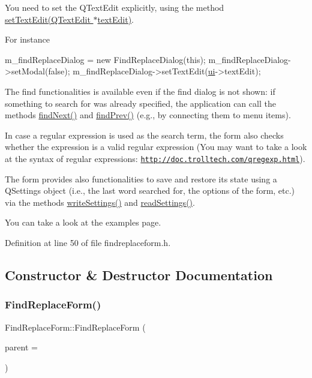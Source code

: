 You need to set the Q\+Text\+Edit explicitly, using the method \hyperlink{class_find_replace_form_ad621f91f15f0902a050c67e66c839d6f}{set\+Text\+Edit(\+Q\+Text\+Edit $\ast$text\+Edit)}.

For instance 
\begin{DoxyCode}
m\_findReplaceDialog = \textcolor{keyword}{new} FindReplaceDialog(\textcolor{keyword}{this});
m\_findReplaceDialog->setModal(\textcolor{keyword}{false});
m\_findReplaceDialog->setTextEdit(\hyperlink{class_find_replace_form_a9bf9e9096feff863dcd6c2a989e07d2c}{ui}->textEdit);
\end{DoxyCode}


The find functionalities is available even if the find dialog is not shown\+: if something to search for was already specified, the application can call the methods \hyperlink{class_find_replace_form_a4aa85cfca1753dd04c1a118ac17257d9}{find\+Next()} and \hyperlink{class_find_replace_form_a98ff3bc6e591f268bb44ce02c5e70663}{find\+Prev()} (e.\+g., by connecting them to menu items).

In case a regular expression is used as the search term, the form also checks whether the expression is a valid regular expression (You may want to take a look at the syntax of regular expressions\+: \href{http://doc.trolltech.com/qregexp.html}{\tt http\+://doc.\+trolltech.\+com/qregexp.\+html}).

The form provides also functionalities to save and restore its state using a Q\+Settings object (i.\+e., the last word searched for, the options of the form, etc.) via the methods \hyperlink{class_find_replace_form_a8746401be4fbab54b6019a76e05e7b43}{write\+Settings()} and \hyperlink{class_find_replace_form_a87e0f16b427e570ede2a219b16300c2a}{read\+Settings()}.

You can take a look at the examples page. 

Definition at line 50 of file findreplaceform.\+h.



\subsection{Constructor \& Destructor Documentation}
\mbox{\label{class_find_replace_form_ad168473a919873f5cf6f9531e9c7faf3}} 
\subsubsection{\texorpdfstring{Find\+Replace\+Form()}{FindReplaceForm()}}
{\footnotesize\ttfamily Find\+Replace\+Form\+::\+Find\+Replace\+Form (\begin{DoxyParamCaption}\item[{Q\+Widget $\ast$}]{parent = {} }\end{DoxyParamCaption})}



